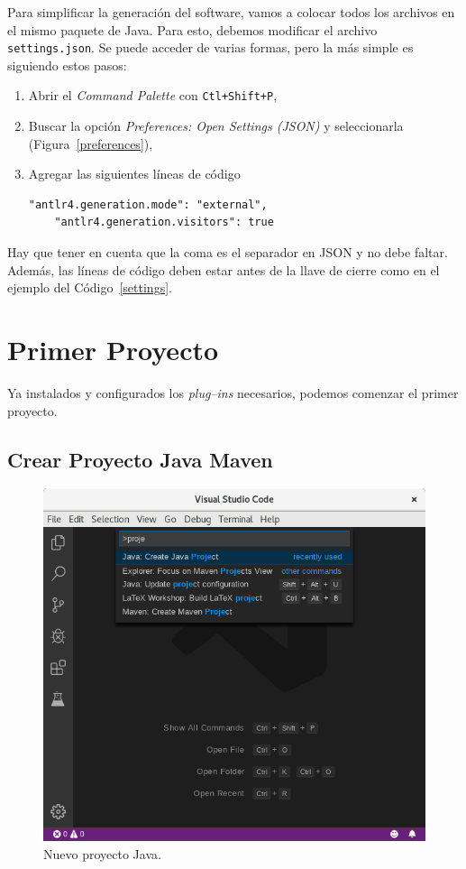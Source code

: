 \documentclass[a5paper,10pt]{article}
\begin{document}
Para simplificar la generación del software, vamos a colocar todos los archivos en el mismo paquete de Java.  Para esto, debemos modificar el archivo \verb|settings.json|.  Se puede acceder de varias formas, pero la más simple es siguiendo estos pasos:
\begin{enumerate}
	\item Abrir el \emph{Command Palette} con \verb|Ctl+Shift+P|,
	\item Buscar la opción \emph{Preferences: Open Settings (JSON)} y seleccionarla (Figura~\ref{preferences}),
	\item Agregar las siguientes líneas de código
	\begin{lstlisting}[style=consola]
	"antlr4.generation.mode": "external",
	"antlr4.generation.visitors": true
	\end{lstlisting}
\end{enumerate}
Hay que tener en cuenta que la coma es el separador en JSON y no debe faltar.  Además, las líneas de código deben estar antes de la llave de cierre como en el ejemplo del Código~\ref{settings}.




\section{Primer Proyecto}
\label{primerproyecto}

Ya instalados y configurados los \emph{plug--ins} necesarios, podemos comenzar el primer proyecto.

\subsection{Crear Proyecto Java Maven}
\label{proyecto_maven}

\begin{figure}[t]
	\centering
	\includegraphics[width=.95\textwidth]{NuevoProyecto}
	\caption{Nuevo proyecto Java.}
	\label{maven_nuevo}
\end{figure}
\end{document}
